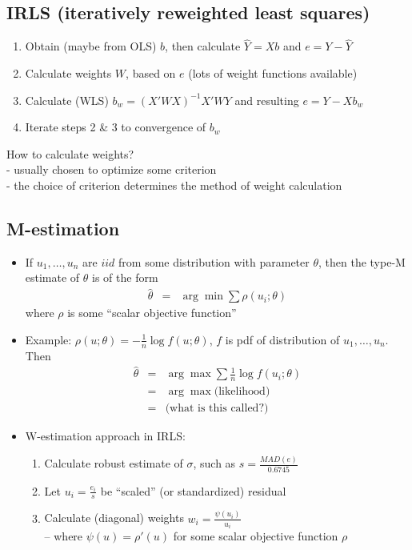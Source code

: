\documentclass[12pt]{../notes}
\begin{document}
\subsection{IRLS (iteratively reweighted least squares)}
\begin{enumerate}
  \item Obtain (maybe from OLS) ${b}$, then calculate $\hat{Y} = X b$
        and $e = Y - \hat{Y}$
  \item Calculate weights $W$, based on $e$
        (lots of weight functions available)
  \item Calculate (WLS) $b_w = (X' W X)^{-1} X' W Y$
        and resulting $e = Y - X b_w$
  \item Iterate steps 2 \& 3 to convergence of $b_w$
\end{enumerate}

How to calculate weights?\\
 - usually chosen to optimize some criterion\\
 - the choice of criterion determines the method of weight calculation

\subsection{M-estimation}
\begin{itemize}
\item If $u_1, \ldots, u_n$ are $iid$ from some distribution with
parameter $\theta$, then the type-M estimate of $\theta$ is of the
form
\begin{eqnarray}
  \hat{\theta} & = & \arg \min \sum \rho(u_i; \theta) \nonumber
\end{eqnarray}
where $\rho$ is some ``scalar
objective function''\\
\item
Example: $\rho(u; \theta) = - \frac{1}{n} \log f(u;\theta)$, $f$ is
pdf of distribution of $u_1, \ldots, u_n$. Then
\begin{eqnarray}
  \hat{\theta} & = & \arg \max \sum \frac{1}{n} \log f(u_i; \theta)
  \nonumber \\
  & = & \arg \max \mbox{(likelihood)} \nonumber \\
  & = & \mbox{(what is this called?)} \nonumber
\end{eqnarray}
\item W-estimation approach in IRLS:
\begin{enumerate}
  \item Calculate robust estimate of $\sigma$, such as $s =
  \frac{MAD(e)}{0.6745}$
  \item Let $u_i = \frac{e_i}{s}$ be ``scaled'' (or standardized) residual
  \item Calculate (diagonal) weights $w_i = \frac{\psi(u_i)}{u_i}$\\
   -- where   $\psi(u) = \rho'(u)$ for some scalar objective function $\rho$
\end{enumerate}
\end{itemize}
\end{document}
